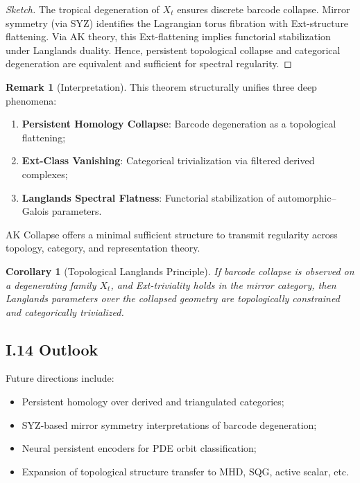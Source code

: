 \documentclass[11pt]{article}
\newtheorem{corollary}[theorem]{Corollary}
\theoremstyle{definition}
\newtheorem{remark}[theorem]{Remark}
\begin{document}
\begin{proof}[Sketch]
The tropical degeneration of $X_t$ ensures discrete barcode collapse.  
Mirror symmetry (via SYZ) identifies the Lagrangian torus fibration with Ext-structure flattening.  
Via AK theory, this Ext-flattening implies functorial stabilization under Langlands duality.  
Hence, persistent topological collapse and categorical degeneration are equivalent and sufficient for spectral regularity.
\end{proof}

\begin{remark}[Interpretation]
This theorem structurally unifies three deep phenomena:
\begin{enumerate}
  \item \textbf{Persistent Homology Collapse}: Barcode degeneration as a topological flattening;
  \item \textbf{Ext-Class Vanishing}: Categorical trivialization via filtered derived complexes;
  \item \textbf{Langlands Spectral Flatness}: Functorial stabilization of automorphic–Galois parameters.
\end{enumerate}
AK Collapse offers a minimal sufficient structure to transmit regularity across topology, category, and representation theory.
\end{remark}

\begin{corollary}[Topological Langlands Principle]
If barcode collapse is observed on a degenerating family $X_t$, and Ext-triviality holds in the mirror category,  
then Langlands parameters over the collapsed geometry are topologically constrained and categorically trivialized.
\end{corollary}


\subsection*{I.14 Outlook}
Future directions include:
\begin{itemize}
  \item Persistent homology over derived and triangulated categories;
  \item SYZ-based mirror symmetry interpretations of barcode degeneration;
  \item Neural persistent encoders for PDE orbit classification;
  \item Expansion of topological structure transfer to MHD, SQG, active scalar, etc.
\end{itemize}
\end{document}
